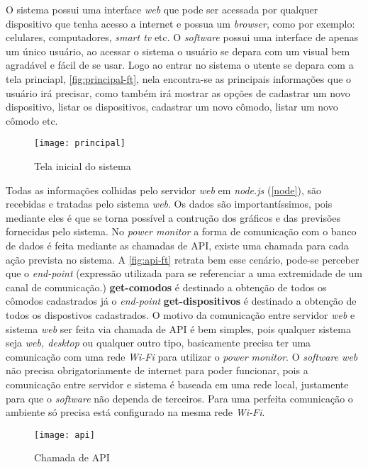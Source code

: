 O sistema possui uma interface \textit{web} que pode ser acessada por qualquer dispositivo que tenha acesso a internet e possua um 
\textit{browser}, como por exemplo: celulares, computadores, \textit{smart tv} etc. O \textit{software} possui uma interface de apenas um único usuário, ao acessar o sistema o usuário se depara com um
visual bem agradável e fácil de se usar. Logo ao entrar no sistema o utente se depara com a tela princiapl, \autoref{fig:principal-ft}, nela encontra-se
as principais informações que o usuário irá precisar, como também irá mostrar as opções de cadastrar um novo dispositivo, listar os dispositivos, cadastrar um novo cômodo,
listar um novo cômodo etc.

\begin{figure}[h!]
	\texttt{[image: principal]}
	\centering
	\caption[Tela inicial do sistema]{Tela inicial do sistema}
	\label{fig:principal-ft}
\end{figure}
\FloatBarrier

Todas as informações colhidas pelo servidor \textit{web} em \textit{node.js} (\autoref{node}), são recebidas e tratadas pelo sistema \textit{web}. Os dados
são importantíssimos, pois mediante eles é que se torna possível a contrução dos gráficos e das previsões fornecidas pelo sistema. No \textit{power monitor}
a forma de comunicação com o banco de dados é feita mediante as chamadas de API, existe uma chamada para cada ação prevista no sistema. A \autoref{fig:api-ft}
retrata bem esse cenário, pode-se perceber que o \textit{end-point} (expressão utilizada para se referenciar a uma extremidade de um canal de comunicação.) 
\textbf{get-comodos} é destinado a obtenção de todos os cômodos cadastrados já o \textit{end-point} \textbf{get-dispositivos} é destinado a 
obtenção de todos os dispostivos cadastrados. O motivo da comunicação entre servidor \textit{web} e sistema \textit{web}
ser feita via chamada de API é bem simples, pois qualquer sistema seja \textit{web, desktop} ou qualquer outro tipo, basicamente precisa ter uma comunicação com uma rede \textit{Wi-Fi}
para utilizar o \textit{power monitor}. O \textit{software web} não precisa obrigatoriamente de internet para poder funcionar, pois a comunicação entre servidor e sistema é
baseada em uma rede local, justamente para que o \textit{software} não dependa de terceiros. Para uma perfeita comunicação o ambiente só precisa está configurado
na mesma rede \textit{Wi-Fi}. 

\begin{figure}[h!]
	\texttt{[image: api]}
	\centering
	\caption[Chamada de API]{Chamada de API}
	\label{fig:api-ft}
\end{figure}
\FloatBarrier

